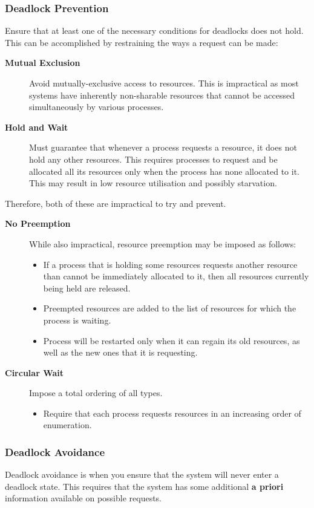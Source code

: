 \documentclass{article}%
\begin{document}
\subsubsection{Deadlock Prevention}
\label{sec:org7b91dfe}
Ensure that at least one of the necessary conditions for deadlocks does not hold.
This can be accomplished by restraining the ways a request can be made:
\begin{description}
\item[{\textbf{Mutual Exclusion}}] Avoid mutually-exclusive access to resources. This is impractical as most systems have inherently non-sharable resources that cannot be accessed simultaneously by various processes.
\item[{\textbf{Hold and Wait}}] Must guarantee that whenever a process requests a resource, it does not hold any other resources. This requires processes to request and be allocated all its resources only when the process has none allocated to it. This may result in low resource utilisation and possibly starvation.
\end{description}
Therefore, both of these are impractical to try and prevent. 
\begin{description}
\item[{\textbf{No Preemption}}] While also impractical, resource preemption may be imposed as follows:
\begin{itemize}
\item If a process that is holding some resources requests another resource than cannot be immediately allocated to it, then all resources currently being held are released.
\item Preempted resources are added to the list of resources for which the process is waiting.
\item Process will be restarted only when it can regain its old resources, as well as the new ones that it is requesting.
\end{itemize}
\item[{\textbf{Circular Wait}}] Impose a total ordering of all types.
\begin{itemize}
\item Require that each process requests resources in an increasing order of enumeration.
\end{itemize}
\end{description}

\subsubsection{Deadlock Avoidance}
\label{sec:org90395a0}
   Deadlock avoidance is when you ensure that the system will never enter a deadlock state. 
This requires that the system has some additional \textbf{a priori} information available on possible requests.
\end{document}
